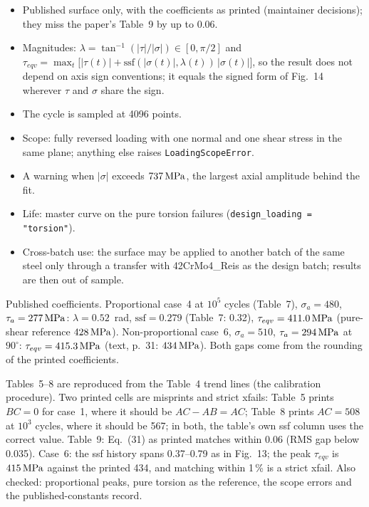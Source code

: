 \begin{itemize}
\item Published surface only, with the coefficients as printed (maintainer decisions); they miss the
  paper's Table~9 by up to 0.06.
\item Magnitudes: $\lambda=\tan^{-1}(|\tau|/|\sigma|)\in[0,\pi/2]$ and
  $\tau_{eqv}=\max_t\bigl[|\tau(t)|+\mathrm{ssf}(|\sigma(t)|,\lambda(t))\,|\sigma(t)|\bigr]$, so the result
  does not depend on axis sign conventions; it equals the signed form of Fig.~14 wherever $\tau$ and
  $\sigma$ share the sign.
\item The cycle is sampled at 4096 points.
\item Scope: fully reversed loading with one normal and one shear stress in the same plane; anything
  else raises \texttt{LoadingScopeError}.
\item A warning when $|\sigma|$ exceeds $737\,\mathrm{MPa}$, the largest axial amplitude behind the fit.
\item Life: master curve on the pure torsion failures (\texttt{design\_loading = "torsion"}).
\item Cross-batch use: the surface may be applied to another batch of the same steel only through a
  transfer with 42CrMo4\_Reis as the design batch; results are then out of sample.
\end{itemize}

 Published coefficients. Proportional case~4 at $10^5$ cycles (Table~7),
$\sigma_a=480$, $\tau_a=277\,\mathrm{MPa}$: $\lambda=0.52$~rad, $\mathrm{ssf}=0.279$ (Table~7: 0.32),
$\tau_{eqv}=411.0\,\mathrm{MPa}$ (pure-shear reference $428\,\mathrm{MPa}$). Non-proportional case~6, $\sigma_a=510$,
$\tau_a=294\,\mathrm{MPa}$ at $90^\circ$: $\tau_{eqv}=415.3\,\mathrm{MPa}$ (text, p.~31: $434\,\mathrm{MPa}$). Both gaps come from
the rounding of the printed coefficients.

 Tables~5--8 are reproduced from the Table~4 trend lines (the calibration
procedure). Two printed cells are misprints and strict xfails: Table~5 prints $BC=0$ for case~1, where
it should be $AC-AB=AC$; Table~8 prints $AC=508$ at $10^3$ cycles, where it should be 567; in both, the
table's own ssf column uses the correct value. Table~9: Eq.~(31) as printed matches within 0.06 (RMS
gap below 0.035). Case~6: the ssf history spans 0.37--0.79 as in Fig.~13; the peak $\tau_{eqv}$ is
$415\,\mathrm{MPa}$ against the printed 434, and matching within 1\,\% is a strict xfail. Also checked:
proportional peaks, pure torsion as the reference, the scope errors and the published-constants
record.
